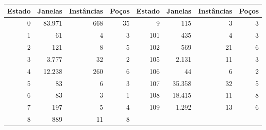 \begin{tabular}{rrrr@{\qquad}rrrr}
\toprule
Estado & Janelas & Instâncias & Poços & Estado & Janelas & Instâncias & Poços \\
\midrule
0 & 83.971 & 668 & 35 & 9 & 115 & 3 & 3 \\
1 & 61 & 4 & 3 & 101 & 435 & 4 & 3 \\
2 & 121 & 8 & 5 & 102 & 569 & 21 & 6 \\
3 & 3.777 & 32 & 2 & 105 & 2.131 & 11 & 3 \\
4 & 12.238 & 260 & 6 & 106 & 44 & 6 & 2 \\
5 & 83 & 6 & 3 & 107 & 35.358 & 32 & 5 \\
6 & 83 & 3 & 1 & 108 & 18.415 & 11 & 8 \\
7 & 197 & 5 & 4 & 109 & 1.292 & 13 & 6 \\
8 & 889 & 11 & 8 &  &  &  &  \\
\bottomrule
\end{tabular}
